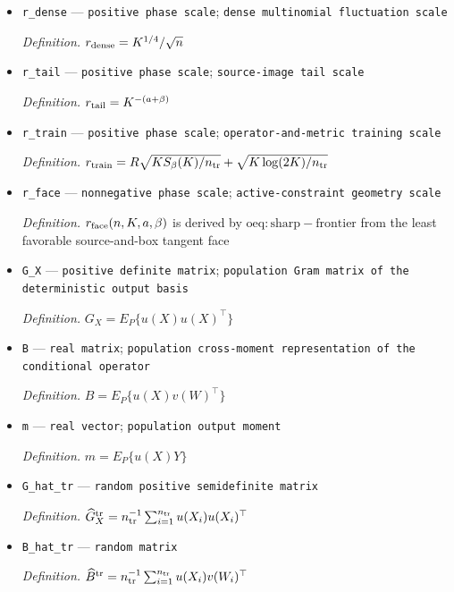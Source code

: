 \documentclass{article}
\begin{document}
\begin{itemize}
  \item \texttt{r\_\allowbreak{}dense} --- \texttt{positive phase scale}; \texttt{dense multinomial fluctuation scale}
  \par\smallskip\noindent\emph{Definition.} \(r_{\rm dense}=K^{1/4}/\sqrt n\)
  \item \texttt{r\_\allowbreak{}tail} --- \texttt{positive phase scale}; \texttt{source-\allowbreak{}image tail scale}
  \par\smallskip\noindent\emph{Definition.} \(r_{\rm tail}=K^{-(a+\beta)}\)
  \item \texttt{r\_\allowbreak{}train} --- \texttt{positive phase scale}; \texttt{operator-\allowbreak{}and-\allowbreak{}metric training scale}
  \par\smallskip\noindent\emph{Definition.} \(r_{\rm train}=R\sqrt{KS_\beta(K)/n_{\rm tr}}+\sqrt{K\log(2K)/n_{\rm tr}}\)
  \item \texttt{r\_\allowbreak{}face} --- \texttt{nonnegative phase scale}; \texttt{active-\allowbreak{}constraint geometry scale}
  \par\smallskip\noindent\emph{Definition.} \(r_{\rm face}(n,K,a,\beta)\) is derived by \(\mathrm{oeq:sharp-frontier}\) from the least favorable source-and-box tangent face
  \item \texttt{G\_\allowbreak{}X} --- \texttt{positive definite matrix}; \texttt{population Gram matrix of the deterministic output basis}
  \par\smallskip\noindent\emph{Definition.} \(G_X=E_P\{u(X)u(X)^\top\}\)
  \item \texttt{B} --- \texttt{real matrix}; \texttt{population cross-\allowbreak{}moment representation of the conditional operator}
  \par\smallskip\noindent\emph{Definition.} \(B=E_P\{u(X)v(W)^\top\}\)
  \item \texttt{m} --- \texttt{real vector}; \texttt{population output moment}
  \par\smallskip\noindent\emph{Definition.} \(m=E_P\{u(X)Y\}\)
  \item \texttt{G\_\allowbreak{}hat\_\allowbreak{}tr} --- \texttt{random positive semidefinite matrix}
  \par\smallskip\noindent\emph{Definition.} \(\widehat G_X^{\rm tr}=n_{\rm tr}^{-1}\sum_{i=1}^{n_{\rm tr}}u(X_i)u(X_i)^\top\)
  \item \texttt{B\_\allowbreak{}hat\_\allowbreak{}tr} --- \texttt{random matrix}
  \par\smallskip\noindent\emph{Definition.} \(\widehat B^{\rm tr}=n_{\rm tr}^{-1}\sum_{i=1}^{n_{\rm tr}}u(X_i)v(W_i)^\top\)

\end{itemize}
\end{document}
